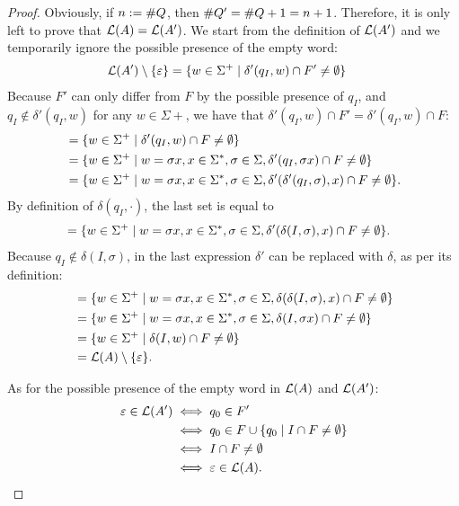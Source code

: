\begin{proof}
	Obviously, if $n:=\# Q$, then $\# Q'=\# Q+1=n+1$. Therefore, it is only left to prove that $\mathcal L(A)=\mathcal L(A')$.
	We start from the definition of $\mathcal L(A')$ and we temporarily ignore the possible presence of the empty word:
	\begin{align*}
		\mathcal L(A')\setminus\{\varepsilon\} & = \{w\in\Sigma^+\mid \delta'(q_I,w)\cap F'\ne\emptyset\}
	\end{align*}
	Because $F'$ can only differ from $F$ by the possible presence of $q_I$, and $q_I\notin\delta'(q_I,w)$ for any $w\in\Sigma\plus$, we have that $\delta'(q_I,w)\cap F'=\delta'(q_I,w)\cap F$:
	\begin{align*}
		 & = \{w\in\Sigma^+\mid \delta'(q_I,w)\cap F\ne\emptyset\}                                                                    \\
		 & = \{w\in\Sigma^+\mid w=\sigma x, x\in\Sigma^*,\sigma\in\Sigma,\delta'(q_I,\sigma x)\cap F\ne\emptyset\}                 \\
		 & = \{w\in\Sigma^+\mid w=\sigma x, x\in\Sigma^*,\sigma\in\Sigma,\delta'(\delta'(q_I,\sigma),x)\cap F\ne\emptyset\} \text.
	\end{align*}
	By definition of $\delta(q_I,\cdot)$, the last set is equal to
	\begin{align*}
		 & = \{w\in\Sigma^+\mid w=\sigma x, x\in\Sigma^*,\sigma\in\Sigma,\delta'(\delta(I,\sigma),x)\cap F\ne\emptyset\} \text.
	\end{align*}
	Because $q_I\notin\delta(I,\sigma)$, in the last expression $\delta'$ can be replaced with $\delta$, as per its definition:
	\begin{align*}
		 & = \{w\in\Sigma^+\mid w=\sigma x, x\in\Sigma^*,\sigma\in\Sigma,\delta(\delta(I,\sigma),x)\cap F\ne\emptyset\} \\
		 & = \{w\in\Sigma^+\mid w=\sigma x, x\in\Sigma^*,\sigma\in\Sigma,\delta(I,\sigma x)\cap F\ne\emptyset\}         \\
		 & = \{w\in\Sigma^+\mid \delta(I,w)\cap F\ne\emptyset\}                                                            \\
		 & = \mathcal L(A)\setminus\{\varepsilon\} \text.
	\end{align*}

	As for the possible presence of the empty word in $\mathcal L(A)$ and $\mathcal L(A')$:
	\begin{align*}
		\varepsilon\in\mathcal L(A') & \iff q_0\in F'                                     \\
		                          & \iff q_0\in F\cup\{q_0\mid I\cap F\ne\emptyset\} \\
		                          & \iff I\cap F\ne\emptyset                           \\
		                          & \iff \varepsilon\in\mathcal L(A) \text. \qedhere
	\end{align*}
\end{proof}



